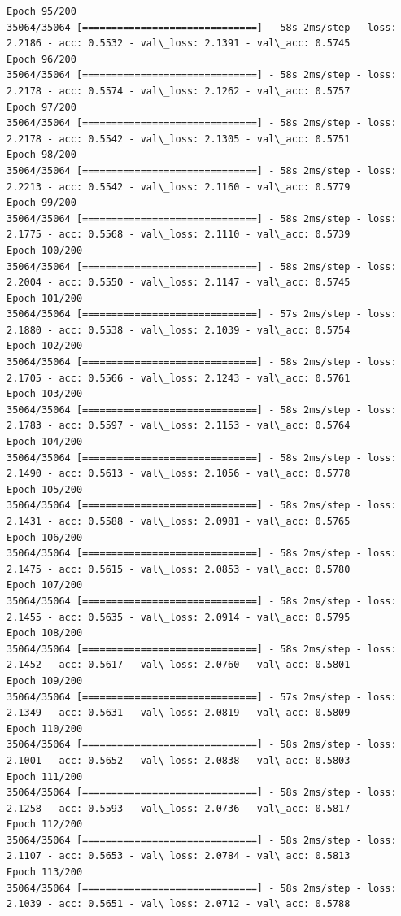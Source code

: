 \documentclass[11pt]{article}
\begin{document}
\begin{Verbatim}[commandchars=\\\{\}]
Epoch 95/200
35064/35064 [==============================] - 58s 2ms/step - loss: 2.2186 - acc: 0.5532 - val\_loss: 2.1391 - val\_acc: 0.5745
Epoch 96/200
35064/35064 [==============================] - 58s 2ms/step - loss: 2.2178 - acc: 0.5574 - val\_loss: 2.1262 - val\_acc: 0.5757
Epoch 97/200
35064/35064 [==============================] - 58s 2ms/step - loss: 2.2178 - acc: 0.5542 - val\_loss: 2.1305 - val\_acc: 0.5751
Epoch 98/200
35064/35064 [==============================] - 58s 2ms/step - loss: 2.2213 - acc: 0.5542 - val\_loss: 2.1160 - val\_acc: 0.5779
Epoch 99/200
35064/35064 [==============================] - 58s 2ms/step - loss: 2.1775 - acc: 0.5568 - val\_loss: 2.1110 - val\_acc: 0.5739
Epoch 100/200
35064/35064 [==============================] - 58s 2ms/step - loss: 2.2004 - acc: 0.5550 - val\_loss: 2.1147 - val\_acc: 0.5745
Epoch 101/200
35064/35064 [==============================] - 57s 2ms/step - loss: 2.1880 - acc: 0.5538 - val\_loss: 2.1039 - val\_acc: 0.5754
Epoch 102/200
35064/35064 [==============================] - 58s 2ms/step - loss: 2.1705 - acc: 0.5566 - val\_loss: 2.1243 - val\_acc: 0.5761
Epoch 103/200
35064/35064 [==============================] - 58s 2ms/step - loss: 2.1783 - acc: 0.5597 - val\_loss: 2.1153 - val\_acc: 0.5764
Epoch 104/200
35064/35064 [==============================] - 58s 2ms/step - loss: 2.1490 - acc: 0.5613 - val\_loss: 2.1056 - val\_acc: 0.5778
Epoch 105/200
35064/35064 [==============================] - 58s 2ms/step - loss: 2.1431 - acc: 0.5588 - val\_loss: 2.0981 - val\_acc: 0.5765
Epoch 106/200
35064/35064 [==============================] - 58s 2ms/step - loss: 2.1475 - acc: 0.5615 - val\_loss: 2.0853 - val\_acc: 0.5780
Epoch 107/200
35064/35064 [==============================] - 58s 2ms/step - loss: 2.1455 - acc: 0.5635 - val\_loss: 2.0914 - val\_acc: 0.5795
Epoch 108/200
35064/35064 [==============================] - 58s 2ms/step - loss: 2.1452 - acc: 0.5617 - val\_loss: 2.0760 - val\_acc: 0.5801
Epoch 109/200
35064/35064 [==============================] - 57s 2ms/step - loss: 2.1349 - acc: 0.5631 - val\_loss: 2.0819 - val\_acc: 0.5809
Epoch 110/200
35064/35064 [==============================] - 58s 2ms/step - loss: 2.1001 - acc: 0.5652 - val\_loss: 2.0838 - val\_acc: 0.5803
Epoch 111/200
35064/35064 [==============================] - 58s 2ms/step - loss: 2.1258 - acc: 0.5593 - val\_loss: 2.0736 - val\_acc: 0.5817
Epoch 112/200
35064/35064 [==============================] - 58s 2ms/step - loss: 2.1107 - acc: 0.5653 - val\_loss: 2.0784 - val\_acc: 0.5813
Epoch 113/200
35064/35064 [==============================] - 58s 2ms/step - loss: 2.1039 - acc: 0.5651 - val\_loss: 2.0712 - val\_acc: 0.5788

\end{Verbatim}
\end{document}
